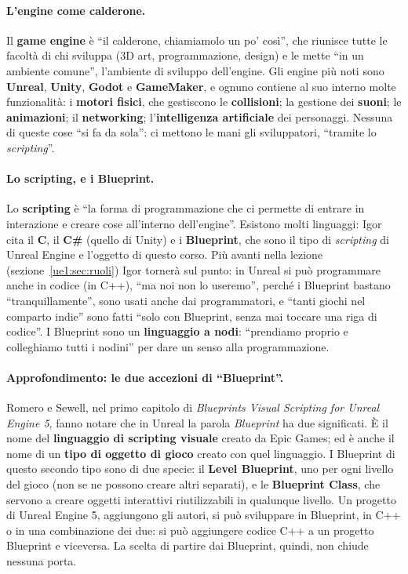 \paragraph{L'engine come calderone.} Il \textbf{game engine} è ``il calderone, chiamiamolo
un po' così'', che riunisce tutte le facoltà di chi sviluppa (3D art, programmazione,
design) e le mette ``in un ambiente comune'', l'ambiente di sviluppo dell'engine. Gli
engine più noti sono \textbf{Unreal}, \textbf{Unity}, \textbf{Godot} e
\textbf{GameMaker}, e ognuno contiene al suo interno molte funzionalità: i
\textbf{motori fisici}, che gestiscono le \textbf{collisioni}; la gestione dei
\textbf{suoni}; le \textbf{animazioni}; il \textbf{networking}; l'\textbf{intelligenza
artificiale} dei personaggi. Nessuna di queste cose ``si fa da sola'': ci mettono le
mani gli sviluppatori, ``tramite lo \emph{scripting}''.

\paragraph{Lo scripting, e i Blueprint.} Lo \textbf{scripting} è ``la forma di
programmazione che ci permette di entrare in interazione e creare cose all'interno
dell'engine''. Esistono molti linguaggi: Igor cita il \textbf{C}, il \textbf{C\#}
(quello di Unity) e i \textbf{Blueprint}, che sono il tipo di \emph{scripting} di Unreal
Engine e l'oggetto di questo corso. Più avanti nella lezione (sezione~\ref{ue1:sec:ruoli})
Igor tornerà sul punto: in Unreal si può programmare anche in codice (in C++), ``ma noi
non lo useremo'', perché i Blueprint bastano ``tranquillamente'', sono usati anche dai
programmatori, e ``tanti giochi nel comparto indie'' sono fatti ``solo con Blueprint,
senza mai toccare una riga di codice''. I Blueprint sono un \textbf{linguaggio a nodi}:
``prendiamo proprio e colleghiamo tutti i nodini'' per dare un senso alla
programmazione.

\paragraph{Approfondimento: le due accezioni di ``Blueprint''.} Romero e Sewell, nel
primo capitolo di \emph{Blueprints Visual Scripting for Unreal Engine 5}, fanno notare
che in Unreal la parola \emph{Blueprint} ha due significati. È il nome del
\textbf{linguaggio di scripting visuale} creato da Epic Games; ed è anche il nome di un
\textbf{tipo di oggetto di gioco} creato con quel linguaggio. I Blueprint di questo
secondo tipo sono di due specie: il \textbf{Level Blueprint}, uno per ogni livello del
gioco (non se ne possono creare altri separati), e le \textbf{Blueprint Class}, che
servono a creare oggetti interattivi riutilizzabili in qualunque livello. Un progetto di
Unreal Engine 5, aggiungono gli autori, si può sviluppare in Blueprint, in C++ o in una
combinazione dei due: si può aggiungere codice C++ a un progetto Blueprint e viceversa.
La scelta di partire dai Blueprint, quindi, non chiude nessuna porta.

